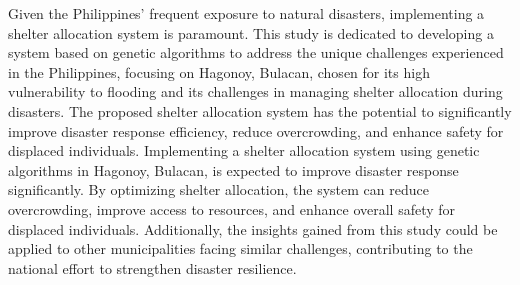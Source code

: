 Given the Philippines' frequent exposure to natural disasters, implementing a shelter allocation system is paramount. This study is dedicated to developing a system based on genetic algorithms to address the unique challenges experienced in the Philippines, focusing on Hagonoy, Bulacan, chosen for its high vulnerability to flooding and its challenges in managing shelter allocation during disasters. The proposed shelter allocation system has the potential to significantly improve disaster response efficiency, reduce overcrowding, and enhance safety for displaced individuals. Implementing a shelter allocation system using genetic algorithms in Hagonoy, Bulacan, is expected to improve disaster response significantly. By optimizing shelter allocation, the system can reduce overcrowding, improve access to resources, and enhance overall safety for displaced individuals. Additionally, the insights gained from this study could be applied to other municipalities facing similar challenges, contributing to the national effort to strengthen disaster resilience.

